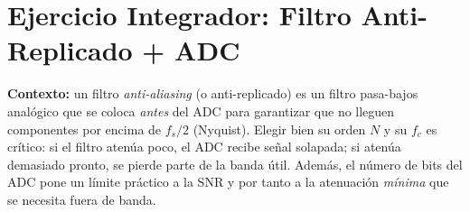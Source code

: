 \documentclass[11pt, a4paper]{article}
\begin{document}
\section{Ejercicio Integrador: Filtro Anti-Replicado + ADC}

\begin{hintbox}
\textbf{Contexto:} un filtro \emph{anti-aliasing} (o anti-replicado) es un filtro pasa-bajos
anal\'ogico que se coloca \emph{antes} del ADC para garantizar que no lleguen componentes
por encima de $f_s/2$ (Nyquist). Elegir bien su orden $N$ y su $f_c$ es cr\'itico:
si el filtro aten\'ua poco, el ADC recibe se\~nal solapada; si aten\'ua demasiado pronto,
se pierde parte de la banda \'util. Adem\'as, el n\'umero de bits del ADC pone un l\'imite
pr\'actico a la SNR y por tanto a la atenuaci\'on \emph{m\'inima} que se necesita fuera de banda.
\end{hintbox}
\end{document}
